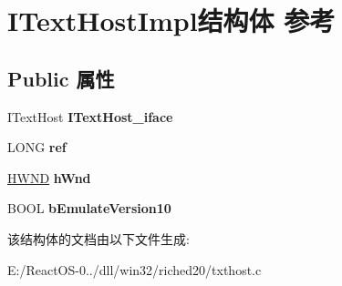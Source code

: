 \hypertarget{struct_i_text_host_impl}{}\section{I\+Text\+Host\+Impl结构体 参考}
\label{struct_i_text_host_impl}
\subsection*{Public 属性}
\begin{DoxyCompactItemize}
\item 
\mbox{\label{struct_i_text_host_impl_abb942ebb609fd70a619aa73611c2ebbb}} 
I\+Text\+Host {\bfseries I\+Text\+Host\+\_\+iface}
\item 
\mbox{\label{struct_i_text_host_impl_a5e4fa48b49dbb933bd46e3da661fb64f}} 
L\+O\+NG {\bfseries ref}
\item 
\mbox{\label{struct_i_text_host_impl_aec3103b3a310274f0e740f8b915d3394}} 
\hyperlink{interfacevoid}{H\+W\+ND} {\bfseries h\+Wnd}
\item 
\mbox{\label{struct_i_text_host_impl_a2781c9911d3cbce144dfcb98e05889d4}} 
B\+O\+OL {\bfseries b\+Emulate\+Version10}
\end{DoxyCompactItemize}


该结构体的文档由以下文件生成\+:\begin{DoxyCompactItemize}
\item 
E\+:/\+React\+O\+S-\/0../dll/win32/riched20/txthost.\+c\end{DoxyCompactItemize}
